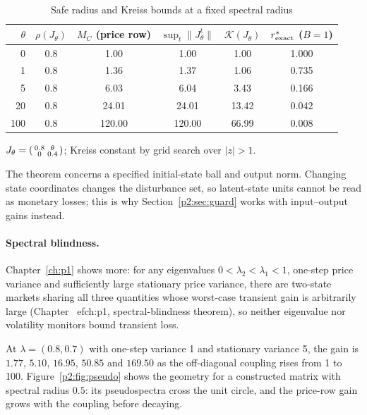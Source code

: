 \begin{table}[t]\centering\small
\begin{threeparttable}
\caption{Safe radius and Kreiss bounds at a fixed spectral radius}\label{p2:tab:kreiss}
\begin{tabular}{rccccc}
\toprule
$\theta$ & $\rho(J_\theta)$ & $M_C$ (price row) & $\sup_t\|J_\theta^t\|$ & $\mathcal K(J_\theta)$ & $r^*_{\rm exact}$ ($B=1$)\\
\midrule
0 & 0.8 & 1.00 & 1.00 & 1.00 & 1.000\\
1 & 0.8 & 1.36 & 1.37 & 1.06 & 0.735\\
5 & 0.8 & 6.03 & 6.04 & 3.43 & 0.166\\
20 & 0.8 & 24.01 & 24.01 & 13.42 & 0.042\\
100 & 0.8 & 120.00 & 120.00 & 66.99 & 0.008\\
\bottomrule
\end{tabular}
\begin{tablenotes}\footnotesize\item $J_\theta=\begin{psmallmatrix}0.8&\theta\\0&0.4\end{psmallmatrix}$; Kreiss constant by grid search over $|z|>1$. \end{tablenotes}
\end{threeparttable}
\end{table}

The theorem concerns a specified initial-state ball and output norm. Changing state coordinates changes the disturbance set, so latent-state units cannot be read as monetary losses; this is why Section~\ref{p2:sec:guard} works with input--output gains instead.

\paragraph{Spectral blindness.} Chapter~\ref{ch:p1} shows more: for any eigenvalues $0<\lambda_2<\lambda_1<1$, one-step price variance and sufficiently large stationary price variance, there are two-state markets sharing all three quantities whose worst-case transient gain is arbitrarily large (Chapter~
ef{ch:p1}, spectral-blindness theorem), so neither eigenvalue nor volatility monitors bound transient loss.

At $\lambda=(0.8,0.7)$ with one-step variance 1 and stationary variance 5, the gain is $1.77$, $5.10$, $16.95$, $50.85$ and $169.50$ as the off-diagonal coupling rises from 1 to 100. Figure~\ref{p2:fig:pseudo} shows the geometry for a constructed matrix with spectral radius $0.5$: its pseudospectra cross the unit circle, and the price-row gain grows with the coupling before decaying.

